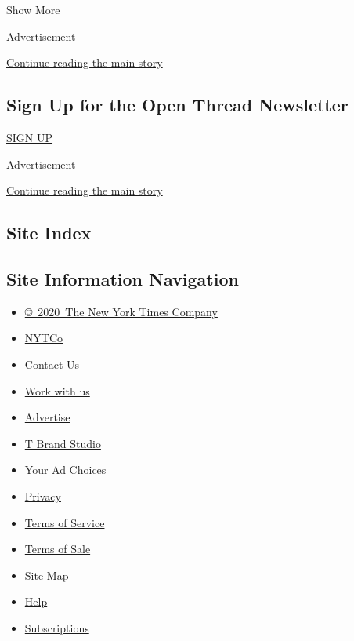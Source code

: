 Show More

Advertisement

\protect\hyperlink{after-mid2}{Continue reading the main story}

\hypertarget{sign-up-for-the-open-thread-newsletter}{%
\subsection{Sign Up for the Open Thread
Newsletter}\label{sign-up-for-the-open-thread-newsletter}}

\href{/newsletters/signup/TZ}{SIGN UP}

Advertisement

\protect\hyperlink{after-mktg}{Continue reading the main story}

\hypertarget{site-index}{%
\subsection{Site Index}\label{site-index}}

\hypertarget{site-information-navigation}{%
\subsection{Site Information
Navigation}\label{site-information-navigation}}

\begin{itemize}
\tightlist
\item
  \href{https://help.nytimes3xbfgragh.onion/hc/en-us/articles/115014792127-Copyright-notice}{©~2020~The
  New York Times Company}
\end{itemize}

\begin{itemize}
\tightlist
\item
  \href{https://www.nytco.com/}{NYTCo}
\item
  \href{https://help.nytimes3xbfgragh.onion/hc/en-us/articles/115015385887-Contact-Us}{Contact
  Us}
\item
  \href{https://www.nytco.com/careers/}{Work with us}
\item
  \href{https://nytmediakit.com/}{Advertise}
\item
  \href{http://www.tbrandstudio.com/}{T Brand Studio}
\item
  \href{https://www.nytimes3xbfgragh.onion/privacy/cookie-policy\#how-do-i-manage-trackers}{Your
  Ad Choices}
\item
  \href{https://www.nytimes3xbfgragh.onion/privacy}{Privacy}
\item
  \href{https://help.nytimes3xbfgragh.onion/hc/en-us/articles/115014893428-Terms-of-service}{Terms
  of Service}
\item
  \href{https://help.nytimes3xbfgragh.onion/hc/en-us/articles/115014893968-Terms-of-sale}{Terms
  of Sale}
\item
  \href{https://spiderbites.nytimes3xbfgragh.onion}{Site Map}
\item
  \href{https://help.nytimes3xbfgragh.onion/hc/en-us}{Help}
\item
  \href{https://www.nytimes3xbfgragh.onion/subscription?campaignId=37WXW}{Subscriptions}
\end{itemize}
